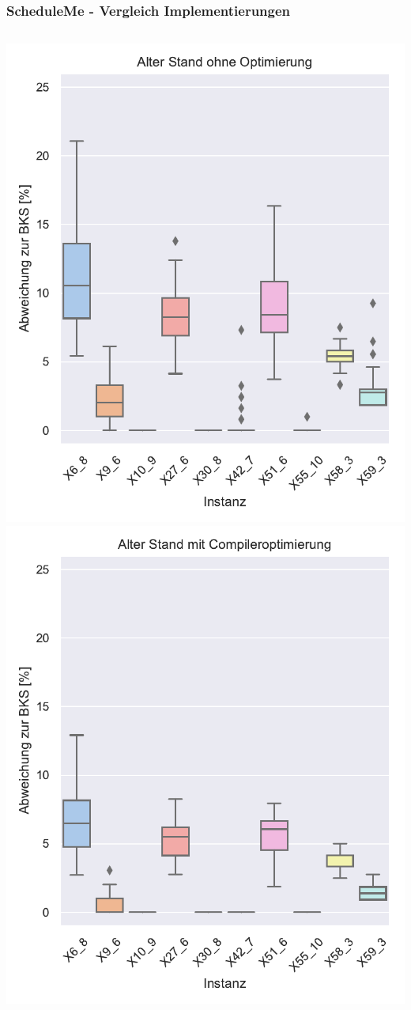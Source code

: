 \documentclass[aspectratio=169]{beamer}
\begin{document}
\begin{frame}
	\frametitle{ScheduleMe - Vergleich Implementierungen}
	
		\begin{columns}[c]
				\includegraphics[width=\textwidth]{../images/results_old.pdf}	
				\includegraphics[width=\textwidth]{../images/results_oldo3.pdf}	

\end{columns}
\end{frame}
\end{document}

